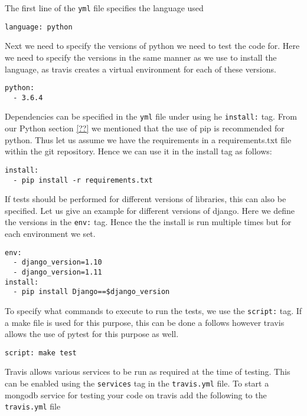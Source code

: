 The first line of the \texttt{yml} file specifies the language used

\begin{lstlisting}
language: python
\end{lstlisting}

Next we need to specify the versions of python we need to test the code
for. Here we need to specify the versions in the same manner as we use
to install the language, as travis creates a virtual environment for
each of these versions.

\begin{lstlisting}
python:
  - 3.6.4
\end{lstlisting}

Dependencies can be specified in the \texttt{yml} file under using he
\texttt{install:} tag. From our Python section \ref{??} we mentioned
that the use of pip is recommended for python. Thus let us assume we
have the requirements in a requirements.txt file within the git
repository. Hence we can use it in the install tag as follows:

\begin{lstlisting}
install:
  - pip install -r requirements.txt
\end{lstlisting}

If tests should be performed for different versions of libraries, this
can also be specified. Let us give an example for different versions of
django. Here we define the versions in the \texttt{env:} tag. Hence the
the install is run multiple times but for each environment we set.

\begin{lstlisting}
env:
  - django_version=1.10
  - django_version=1.11
install:
  - pip install Django==$django_version
\end{lstlisting}

To specify what commands to execute to run the tests, we use the
\texttt{script:} tag. If a make file is used for this purpose, this can
be done a follows however travis allows the use of pytest for this
purpose as well.

\begin{lstlisting}
script: make test
\end{lstlisting}

Travis allows various services to be run as required at the time of
testing. This can be enabled using the \texttt{services} tag in the
\texttt{travis.yml} file. To start a mongodb service for testing your
code on travis add the following to the \texttt{travis.yml} file

